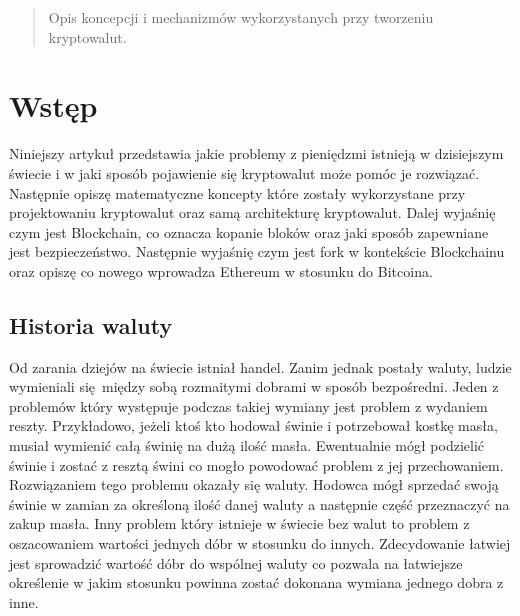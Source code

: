 \documentclass[journal,12pt,onecolumn,draftclsnofoot,]{IEEEtran}
\begin{document}
\begin{abstract}
Opis koncepcji i mechanizmów wykorzystanych przy tworzeniu kryptowalut.
\end{abstract}





%
\IEEEpeerreviewmaketitle

\section{Wstęp}

Niniejszy artykuł przedstawia jakie problemy z pieniędzmi istnieją w dzisiejszym świecie i w jaki sposób pojawienie się
kryptowalut może pomóc je rozwiązać. Następnie opiszę matematyczne koncepty które zostały wykorzystane przy
projektowaniu kryptowalut oraz samą architekturę kryptowalut. Dalej wyjaśnię czym jest Blockchain, co oznacza kopanie
bloków oraz jaki sposób zapewniane jest bezpieczeństwo. Następnie wyjaśnię czym jest fork w kontekście Blockchainu oraz
opiszę co nowego wprowadza Ethereum w stosunku do Bitcoina.

\subsection{Historia waluty}

Od zarania dziejów na świecie istniał handel. Zanim jednak postały waluty, ludzie wymieniali się między sobą rozmaitymi
dobrami w sposób bezpośredni.  Jeden z problemów który występuje podczas takiej wymiany jest problem z wydaniem reszty.
Przykładowo, jeżeli ktoś kto hodował świnie i potrzebował kostkę masła, musiał wymienić całą świnię na dużą ilość masła.
Ewentualnie mógł podzielić świnie i zostać z resztą świni co mogło powodować problem z jej przechowaniem. Rozwiązaniem
tego problemu okazały się waluty. Hodowca mógł sprzedać swoją świnie w zamian za określoną ilość danej waluty a
następnie część przeznaczyć na zakup masła. Inny problem który istnieje w świecie bez walut to problem z oszacowaniem
wartości jednych dóbr w stosunku do innych. Zdecydowanie łatwiej jest sprowadzić wartość dóbr do wspólnej waluty co
pozwala na łatwiejsze określenie w jakim stosunku powinna zostać dokonana wymiana jednego dobra z inne.
\end{document}
